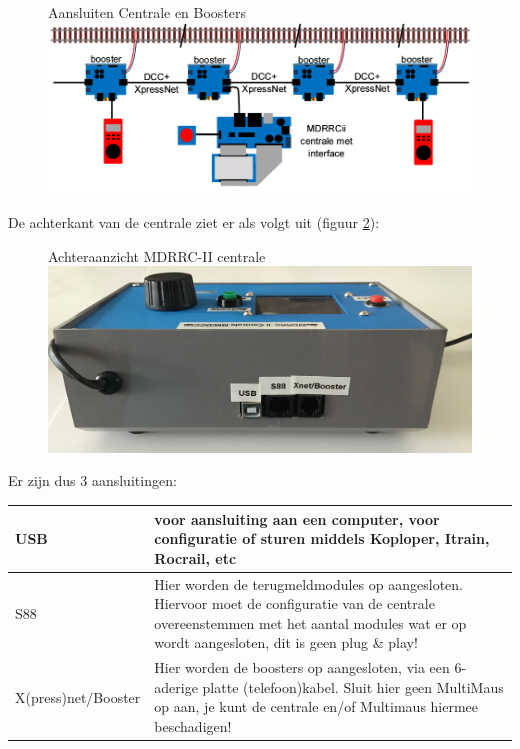 \documentclass[12pt,a4paper]{report}
\begin{document}
\begin{figure}[ht]
  \captionbox
  {Aansluiten Centrale en Boosters\label{im:aansluiten_booster}}
  {\includegraphics[scale=0.5]{images/rcu_schema1}\\}
\end{figure}

De achterkant van de centrale ziet er als volgt uit (figuur \ref{centrale_achter}):\\

\begin{figure}[h]
  \captionbox
  {Achteraanzicht MDRRC-II centrale\label{centrale_achter}}
  {\includegraphics[scale=0.3]{images/rcu_foto5}\\}
\end{figure}

Er zijn dus 3 aansluitingen:\\

\begin{tabular}{|l |p{10cm}|}
\hline
USB&voor aansluiting aan een computer, voor configuratie of sturen middels Koploper, Itrain, Rocrail, etc\\
\hline
S88&Hier worden de terugmeldmodules op aangesloten. Hiervoor moet de configuratie van de centrale overeenstemmen met het aantal modules wat er op wordt aangesloten, dit is geen plug \& play!\\
\hline
X(press)net/Booster&Hier worden de boosters op aangesloten, via een 6-aderige platte (telefoon)kabel. Sluit hier geen MultiMaus op aan, je kunt de centrale en/of Multimaus hiermee beschadigen!\\
\hline
\end{tabular}\\
\end{document}
